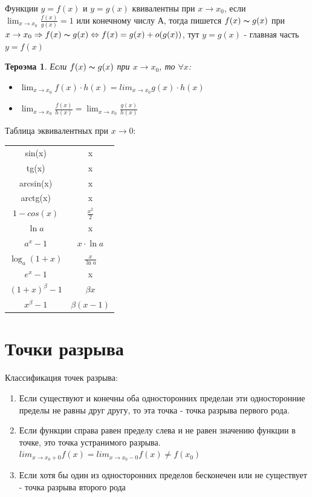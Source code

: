 \documentclass[oneside]{book}
\newtheorem{thm}{Тероэма}[chapter] %
\begin{document}
    Функции $y = f(x)$ и $y = g(x)$ квивалентны при $x \rightarrow x_0$, если $\lim_{x \rightarrow x_0}{\frac{f(x)}{g(x)}} = 1$ или
    конечному числу А, тогда пишется $f(x) \thicksim g(x)$ при $x \rightarrow x_0 \Rightarrow f(x) \thicksim g(x) \Leftrightarrow
    f(x) = g(x) + o(g(x))$, тут $y = g(x)$ - главная часть $y = f(x)$
    \begin{thm}
        Если $f(x) \thicksim g(x)$ при $x \rightarrow x_0$, то $\forall x$: \begin{itemize}
            \item $\lim_{x \rightarrow x_0}{f(x) \cdot h(x)} = lim_{x \rightarrow x_0}{g(x) \cdot h(x)}$
            \item $\lim_{x \rightarrow x_0}{\frac{f(x)}{h(x)}} = \lim_{x \rightarrow x_0}{\frac{g(x)}{h(x)}}$
        \end{itemize}
    \end{thm}
    Таблица эквивалентных при $x \rightarrow 0$: \\
    \begin{center}
        \begin{tabular}{c|c}
            sin(x) & x\\
            tg(x) & x\\
            arcsin(x) & x\\
            arctg(x) & x\\
            $1 - cos(x)$ & $\frac{x^2}{2}$ \\
            $\ln{a}$ & x \\
            $a^x - 1$ & $x \cdot \ln{a}$ \\
            $\log_{a}{(1+x)}$ & $\frac{x}{\ln{a}}$ \\
            $e^x - 1$ & x \\
            $(1+x)^\beta - 1$ & $\beta x$ \\
            $x^\beta - 1$ & $\beta(x-1)$
        \end{tabular}
    \end{center}


    \setcounter{chapter}{13}
    \chapter{Точки разрыва}
    
	Классификация точек разрыва:
\begin{enumerate}
    \item Если существуют и конечны оба односторонних пределаи эти односторонние пределы не равны друг другу, то эта точка - точка разрыва
          первого рода.
    \item Если функции справа равен пределу слева и не равен значению функции в точке, это точка устранимого разрыва.
          $lim_{x \rightarrow x_0+0}{f(x)} = lim_{x \rightarrow x_0-0}{f(x)} \neq f(x_0)$
    \item Если хотя бы один из односторонних пределов бесконечен или не существует - точка разрыва второго рода
\end{enumerate}
\end{document}
